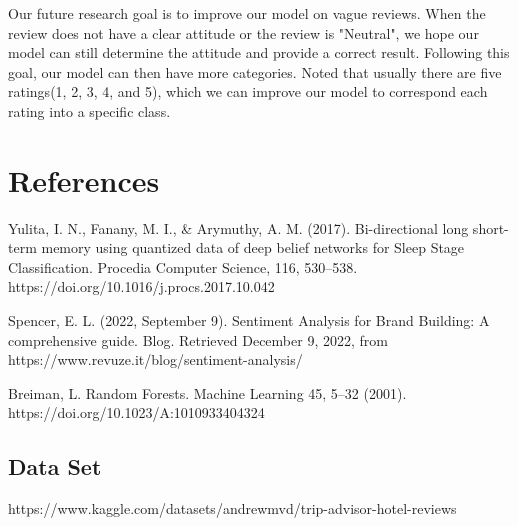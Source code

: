 \documentclass{article}
\begin{document}
\noindent
Our future research goal is to improve our model on vague reviews. When the review does not have a clear attitude or the review is "Neutral", we hope our model can still determine the attitude and provide a correct result. Following this goal, our model can then have more categories. Noted that usually there are five ratings(1, 2, 3, 4, and 5), which we can improve our model to correspond each rating into a specific class.  

\newpage
\section{References}
Yulita, I. N., Fanany, M. I., & Arymuthy, A. M. (2017). Bi-directional long short-term memory using quantized data of deep belief networks for Sleep Stage Classification. Procedia Computer Science, 116, 530–538. https://doi.org/10.1016/j.procs.2017.10.042 \newline

\noindent
Spencer, E. L. (2022, September 9). Sentiment Analysis for Brand Building: A comprehensive guide. Blog. Retrieved December 9, 2022, from https://www.revuze.it/blog/sentiment-analysis/ \newline

\noindent
Breiman, L. Random Forests. Machine Learning 45, 5–32 (2001).
https://doi.org/10.1023/A:1010933404324

\subsection{Data Set}
https://www.kaggle.com/datasets/andrewmvd/trip-advisor-hotel-reviews
\end{document}
